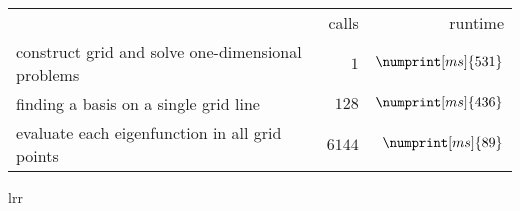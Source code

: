 \begin{tabular}{lrr}
	 & calls & runtime \\
	\hspace{0mm}construct grid and solve one-dimensional problems & $1$ & $\numprint[ms]{531}$ \\
	\hspace{5mm}finding a basis on a single grid line & $128$ & $\numprint[ms]{436}$ \\
	\hspace{5mm}evaluate each eigenfunction in all grid points & $6144$ & $\numprint[ms]{89}$\end{tabular}{lrr}
